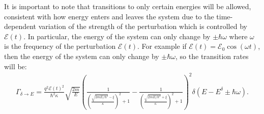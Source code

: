 \documentclass[10pt]{article}
\newcommand{\1}{\mathbf 1}
\begin{document}
It is important to note that transitions to only certain energies will be allowed, consistent with how energy enters and leaves the system due to the time-dependent variation of the strength of the perturbation which is controlled by $\mathcal{E}(t)$.
In particular, the energy of the system can only change by $\pm \hbar \omega$ where $\omega$ is the frequency of the perturbation $\mathcal{E}(t)$.
For example if $\mathcal{E}(t) = \mathcal{E}_0 \cos(\omega t)$, then the energy of the system can only change by $\pm\hbar \omega$, so the transition rates will be:
\begin{align}
	\Gamma_{\delta \to E}
	=
	\frac{q^2 \mathcal{E}(t)^2}{\hbar^2 \kappa }
	\sqrt{\frac{2m}{E}}
		\left(
			\frac{1}{\left(\frac{\sqrt{2m E/\hbar^2} - \xi}{\kappa}\right)^2 + 1}
			-
			\frac{1}{\left(\frac{\sqrt{2m E/\hbar^2} + \xi}{\kappa}\right)^2 + 1}
		\right)^2
		\delta(E - E^\delta \pm \hbar \omega).
\end{align}
\end{document}
